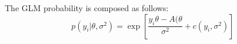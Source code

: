 The GLM probability is composed as follows:
\begin{equation}
    p(y_i| \theta, \sigma^2) = 
    \exp{\left[ \frac{y_i\theta - A(\theta}{\sigma^2} + c(y_i,\sigma^2) \right] }
\end{equation}


%
%





%
